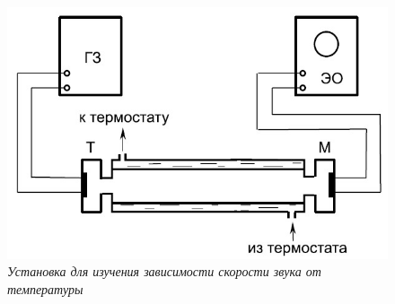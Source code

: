 \documentclass{article}
\begin{document}
\newpage

\begin{figure}[h!]
	\begin{center}
		\includegraphics[width=12cm]{ust2.jpg}
	\end{center}
	\caption{\textit{Установка для изучения зависимости скорости звука от температуры}}
	\label{img2}
\end{figure}
\end{document}
